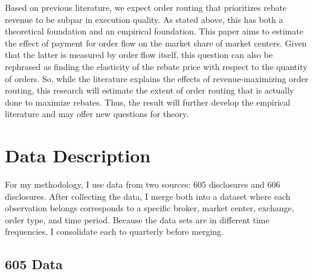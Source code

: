 \documentclass[11pt,a4paper]{article}
\begin{document}
Based on previous literature, we expect order routing that prioritizes rebate revenue to be subpar in execution quality. As stated above, this has both a theoretical foundation and an empirical foundation. This paper aims to estimate the effect of payment for order flow on the market share of market centers. Given that the latter is measured by order flow itself, this question can also be rephrased as finding the elasticity of the rebate price with respect to the quantity of orders. So, while the literature explains the effects of revenue-maximizing order routing, this research will estimate the extent of order routing that is actually done to maximize rebates. Thus, the result will further develop the empirical literature and may offer new questions for theory. 






	
\pagebreak	
\section{Data Description}

	For my methodology, I use data from two sources: 605 disclosures and 606 disclosures. After collecting the data, I merge both into a dataset where each observation belongs corresponds to a specific broker, market center, exchange, order type, and time period. Because the data sets are in different time frequencies, I consolidate each to quarterly before merging. 
	
	\subsection{605 Data}
	
\end{document}
